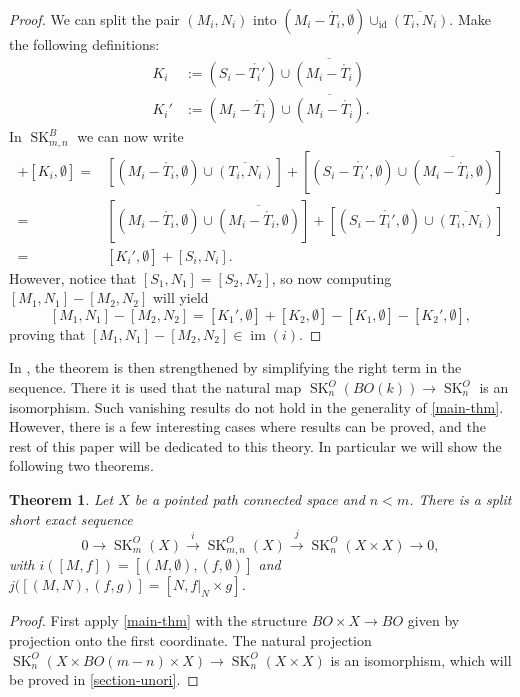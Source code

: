 \documentclass{amsart}
\newtheorem{thm}{Theorem}[section]
\theoremstyle{definition}
\theoremstyle{remark}
\newcommand{\im}{\operatorname{im}}
\newcommand{\SK}{\operatorname{SK}}
\begin{document}
\begin{proof}
    We can split the pair $(M_i, N_i)$ into $(M_i-\mathring{T_i},\emptyset) \cup_{\text{id}} \overline{(T_i, N_i)}$. Make the following definitions:
    \begin{align*}
        K_i &:= (S_i - \mathring{T_i'}) \cup \overline{(M_i-\mathring{T_i})} \\
        K_i' &:= (M_i-\mathring{T_i}) \cup \overline{(M_i-\mathring{T_i})}.
    \end{align*}
    In $\SK_{m,n}^B$ we can now write
    \begin{align*}
        [M_i, N_i] + [K_i, \emptyset]
        =& [(M_i-\mathring{T_i},\emptyset)\cup \overline{(T_i,N_i)}] + [(S_i-\mathring{T_i'},\emptyset)\cup \overline{(M_i-\mathring{T_i},\emptyset)}]\\
        =& [(M_i-\mathring{T_i},\emptyset)\cup\overline{(M_i-\mathring{T_i},\emptyset)}] + [(S_i-\mathring{T_i'},\emptyset)\cup\overline{(T_i,N_i)}]\\
        =& [K_i',\emptyset] + [S_i, N_i].
    \end{align*}
    \noindent
    However, notice that $[S_1, N_1] = [S_2, N_2]$, so now computing $[M_1, N_1] - [M_2, N_2]$ will yield
        \[[M_1, N_1] - [M_2, N_2]
        = [K_1', \emptyset] + [K_2, \emptyset] - [K_1,\emptyset] - [K_2', \emptyset],\]
    proving that $[M_1, N_1] - [M_2, N_2]\in \im(i)$.
\end{proof}

In \cite{komiya1986}, the theorem is then strengthened by simplifying the right term in the sequence. There it is used that the natural map $\SK_n^O(BO(k)) \to \SK_n^O$ is an isomorphism. Such vanishing results do not hold in the generality of \cref{main-thm}. However, there is a few interesting cases where results can be proved, and the rest of this paper will be dedicated to this theory. In particular we will show the following two theorems.

\begin{thm}
    \label{komiya-unori}
    Let $X$ be a pointed path connected space and $n<m$. There is a split short exact sequence
    \[0 \longrightarrow \SK_m^O(X) \xrightarrow{i}  \SK_{m,n}^O(X) \xrightarrow{j}  \SK_n^O(X\times X) \longrightarrow 0,\]
    with $i([M,f]) = [(M,\emptyset), (f, \emptyset)]$ and $j([(M,N), (f,g)] = [N, f|_N\times g]$.
\end{thm}
\begin{proof}
    First apply \cref{main-thm} with the structure $BO\times X \to BO$ given by projection onto the first coordinate. The natural projection $\SK_n^O(X\times BO(m-n) \times X) \to \SK_n^O(X\times X)$ is an isomorphism, which will be proved in \cref{section-unori}.
\end{proof}
\end{document}
